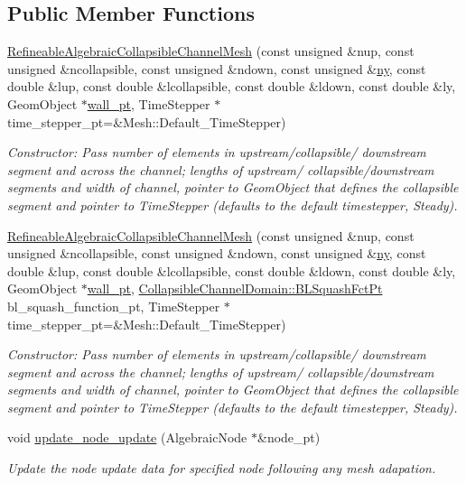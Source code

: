 \subsection*{Public Member Functions}
\begin{DoxyCompactItemize}
\item 
\hyperlink{classoomph_1_1RefineableAlgebraicCollapsibleChannelMesh_a4d55ff9ee001c13c51d3c914f5cdcce8}{Refineable\+Algebraic\+Collapsible\+Channel\+Mesh} (const unsigned \&nup, const unsigned \&ncollapsible, const unsigned \&ndown, const unsigned \&\hyperlink{classoomph_1_1SimpleRectangularQuadMesh_a45011f22dedd480392b1f376e4269921}{ny}, const double \&lup, const double \&lcollapsible, const double \&ldown, const double \&ly, Geom\+Object $\ast$\hyperlink{classoomph_1_1CollapsibleChannelMesh_a04ffeb61678763dfd250962ea9ba614b}{wall\+\_\+pt}, Time\+Stepper $\ast$time\+\_\+stepper\+\_\+pt=\&Mesh\+::\+Default\+\_\+\+Time\+Stepper)
\begin{DoxyCompactList}\small\item\em Constructor\+: Pass number of elements in upstream/collapsible/ downstream segment and across the channel; lengths of upstream/ collapsible/downstream segments and width of channel, pointer to Geom\+Object that defines the collapsible segment and pointer to Time\+Stepper (defaults to the default timestepper, Steady). \end{DoxyCompactList}\item 
\hyperlink{classoomph_1_1RefineableAlgebraicCollapsibleChannelMesh_af36c924e3d8cc2a8659db4185d6612be}{Refineable\+Algebraic\+Collapsible\+Channel\+Mesh} (const unsigned \&nup, const unsigned \&ncollapsible, const unsigned \&ndown, const unsigned \&\hyperlink{classoomph_1_1SimpleRectangularQuadMesh_a45011f22dedd480392b1f376e4269921}{ny}, const double \&lup, const double \&lcollapsible, const double \&ldown, const double \&ly, Geom\+Object $\ast$\hyperlink{classoomph_1_1CollapsibleChannelMesh_a04ffeb61678763dfd250962ea9ba614b}{wall\+\_\+pt}, \hyperlink{classoomph_1_1CollapsibleChannelDomain_a2bf1d7943bfac134a5c27a54c7e1faed}{Collapsible\+Channel\+Domain\+::\+B\+L\+Squash\+Fct\+Pt} bl\+\_\+squash\+\_\+function\+\_\+pt, Time\+Stepper $\ast$time\+\_\+stepper\+\_\+pt=\&Mesh\+::\+Default\+\_\+\+Time\+Stepper)
\begin{DoxyCompactList}\small\item\em Constructor\+: Pass number of elements in upstream/collapsible/ downstream segment and across the channel; lengths of upstream/ collapsible/downstream segments and width of channel, pointer to Geom\+Object that defines the collapsible segment and pointer to Time\+Stepper (defaults to the default timestepper, Steady). \end{DoxyCompactList}\item 
void \hyperlink{classoomph_1_1RefineableAlgebraicCollapsibleChannelMesh_a4bc2b99f24e5e5dc534fe5906d4f4e6e}{update\+\_\+node\+\_\+update} (Algebraic\+Node $\ast$\&node\+\_\+pt)
\begin{DoxyCompactList}\small\item\em Update the node update data for specified node following any mesh adapation. \end{DoxyCompactList}\end{DoxyCompactItemize}
